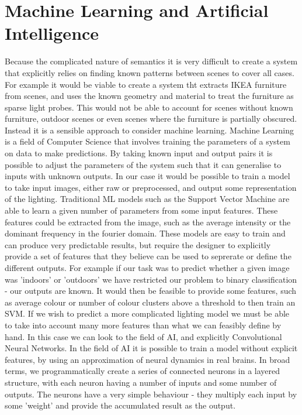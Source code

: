 \documentclass[ %
                    author={Gavin Parker},
                supervisor={Dr. Neill Campbell},
                    degree={MEng},
                     title={Deep Siamese Networks for Illumination Estimation from Stereo Images},
                  subtitle={},
                      type={research},
                      year={2018} ]{dissertation}
\begin{document}
\section{Machine Learning and Artificial Intelligence}
Because the complicated nature of semantics it is very difficult to create a system that explicitly relies on finding known patterns between scenes to cover all cases. For example it would be viable to create a system tht extracts IKEA furniture from scenes, and uses the known geometry and material to treat the furniture as sparse light probes. This would not be able to account for scenes without known furniture, outdoor scenes or even scenes where the furniture is partially obscured. Instead it is a sensible approach to consider machine learning. Machine Learning is a field of Computer Science that involves training the parameters of a system on data to make predictions. By taking known input and output pairs it is possible to adjust the parameters of the system such that it can generalise to inputs with unknown outputs. In our case it would be possible to train a model to take input images, either raw or preprocessed, and output some representation of the lighting. Traditional ML models such as the Support Vector Machine are able to learn a given number of parameters from some input features. These features could be extracted from the image, such as the average intensity or the dominant frequency in the fourier domain. These models are easy to train and can produce very predictable results, but require the designer to explicitly provide a set of features that they believe can be used to seprerate or define the different outputs. For example if our task was to predict whether a given image was 'indoors' or 'outdoors' we have restricted our problem to binary classification - our outputs are known. It would then be feasible to provide some features, such as average colour or number of colour clusters above a threshold to then train an SVM.
\newline
If we wish to predict a more complicated lighting model we must be able to take into account many more features than what we can feasibly define by hand. In this case we can look to the field of AI, and explicitly Convolutional Neural Networks. In the field of AI it is possible to train a model without explicit features, by using an approximation of neural dynamics in real brains. In broad terms, we programmatically create a series of connected neurons in a layered structure, with each neuron having a number of inputs and some number of outputs. The neurons have a very simple behaviour - they multiply each input by some 'weight' and provide the accumulated result as the output.
\end{document}
